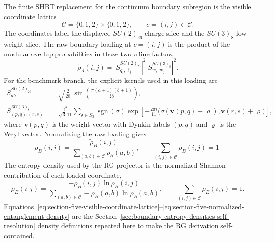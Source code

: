 \documentclass[11pt]{article}
\begin{document}
The finite SHBT replacement for the continuum boundary subregion is the visible
coordinate lattice
\begin{equation}
\label{eq:section-five-visible-coordinate-lattice}
 \mathcal C=\{0,1,2\}\times\{0,1,2\},
 \qquad
 c=(i,j)\in\mathcal C.
\end{equation}
The coordinates label the displayed $SU(2)_{26}$ charge slice and the
$SU(3)_8$ low-weight slice.  The raw boundary loading at $c=(i,j)$ is the
product of the modular overlap probabilities in those two affine factors,
\begin{equation}
\label{eq:section-five-raw-boundary-loading}
 \widetilde\rho_B(i,j)
 =
 \left|S^{SU(2)_{26}}_{q_i,\ell_j}\right|^2
 \left|S^{SU(3)_8}_{w_i,w_j}\right|^2.
\end{equation}
For the benchmark branch, the explicit kernels used in this loading are
\begin{align}
\label{eq:section-five-explicit-visible-s-kernels}
 S_{ab}^{SU(2)_{26}}
 &=
 \sqrt{\frac{2}{28}}\,
 \sin\!\left(\frac{\pi(a+1)(b+1)}{28}\right),\nonumber\\
 S_{(p,q),(r,s)}^{SU(3)_8}
 &=
 \frac{i^3}{\sqrt{3}\,11}
 \sum_{\sigma\in S_3}
 \operatorname{sgn}(\sigma)
 \exp\!\left[
 -\frac{2\pi i}{11}
 \bigl(
 \sigma(\mathbf v(p,q)+\varrho),
 \mathbf v(r,s)+\varrho
 \bigr)
 \right],
\end{align}
where $\mathbf v(p,q)$ is the weight vector with Dynkin labels $(p,q)$ and
$\varrho$ is the Weyl vector.  Normalizing the raw loading gives
\begin{equation}
\label{eq:section-five-normalized-loading-density}
 \rho_B(i,j)
 =
 \frac{\widetilde\rho_B(i,j)}
 {\sum_{(a,b)\in\mathcal C}\widetilde\rho_B(a,b)},
 \qquad
 \sum_{(i,j)\in\mathcal C}\rho_B(i,j)=1.
\end{equation}
The entropy density used by the RG projector is the normalized Shannon
contribution of each loaded coordinate,
\begin{equation}
\label{eq:section-five-normalized-entanglement-density}
 \rho_E(i,j)
 =
 \frac{-\rho_B(i,j)\ln\rho_B(i,j)}
 {\sum_{(a,b)\in\mathcal C}-\rho_B(a,b)\ln\rho_B(a,b)},
 \qquad
 \sum_{(i,j)\in\mathcal C}\rho_E(i,j)=1.
\end{equation}
Equations~\eqref{eq:section-five-visible-coordinate-lattice}--\eqref{eq:section-five-normalized-entanglement-density}
are the Section~\ref{sec:boundary-entropy-densities-self-resolution} density
definitions repeated here to make the RG derivation self-contained.
\end{document}
